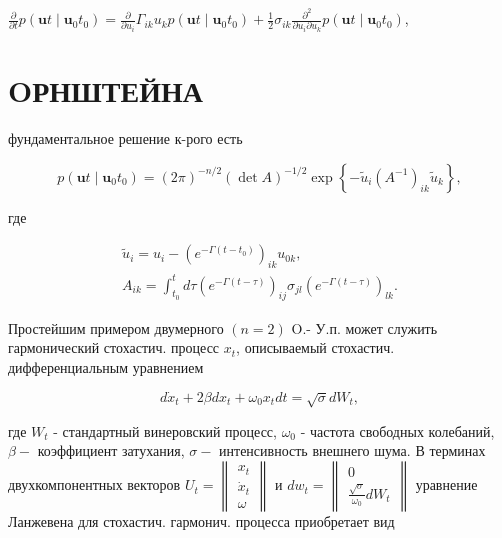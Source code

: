 \documentclass[10pt]{article}
\begin{document}
$\frac{\partial}{\partial t} p\left(\boldsymbol{u} t \mid \boldsymbol{u}_{0} t_{0}\right)=\frac{\partial}{\partial u_{i}} \Gamma_{i k} u_{k} p\left(\boldsymbol{u} t \mid \boldsymbol{u}_{0} t_{0}\right)+\frac{1}{2} \sigma_{i k} \frac{\partial^{2}}{\partial u_{i} \partial u_{k}} p\left(\boldsymbol{u} t \mid \boldsymbol{u}_{0} t_{0}\right)$,



\section{OРНШТЕЙНА}

фундаментальное решение к-рого есть



\[

p\left(\boldsymbol{u} t \mid \boldsymbol{u}_{0} t_{0}\right)=(2 \pi)^{-n / 2}(\operatorname{det} A)^{-1 / 2} \exp \left\{-\tilde{u}_{i}\left(A^{-1}\right)_{i k} \tilde{u}_{k}\right\},

\]



где



\[

\begin{gathered}

\tilde{u}_{i}=u_{i}-\left(e^{-\Gamma\left(t-t_{0}\right)}\right)_{i k} u_{0 k}, \\

A_{i k}=\int_{t_{0}}^{t} d \tau\left(e^{-\Gamma(t-\tau)}\right)_{i j} \sigma_{j l}\left(e^{-\Gamma(t-\tau)}\right)_{l k} .

\end{gathered}

\]



Простейшим примером двумерного $(n=2)$ O.- У.п. может служить гармонический стохастич. процесс $x_{t}$, описываемый стохастич. дифференциальным уравнением



\[

d \dot{x}_{t}+2 \beta d x_{t}+\omega_{0} x_{t} d t=\sqrt{\sigma} d W_{t},

\]



где $W_{t}$ - стандартный винеровский процесс, $\omega_{0}$ - частота свободных колебаний, $\beta-$ коэффициент затухания, $\sigma-$ интенсивность внешнего шума. В терминах двухкомпонентных векторов $U_{t}=\left\|\begin{array}{l}x_{t} \\ \dot{x}_{t} \\ \omega\end{array}\right\|$ и $d w_{t}=\left\|\begin{array}{l}0 \\ \frac{\sqrt{\sigma}}{\omega_{0}} d W_{t}\end{array}\right\|$ уравнение Ланжевена для стохастич. гармонич. процесса приобретает вид
\end{document}
